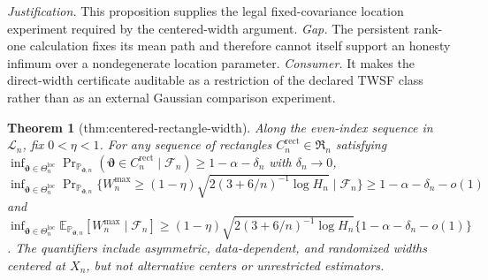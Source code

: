 \documentclass{article}
\newtheorem{theorem}{Theorem}
\begin{document}
\par\smallskip\noindent \textit{Justification.} This proposition supplies the legal fixed-covariance location experiment required by the centered-width argument. \textit{Gap.} The persistent rank-one calculation fixes its mean path and therefore cannot itself support an honesty infimum over a nondegenerate location parameter. \textit{Consumer.} It makes the direct-width certificate auditable as a restriction of the declared TWSF class rather than as an external Gaussian comparison experiment.

\begin{theorem}[thm:centered-rectangle-width]\label{thm:centered-rectangle-width}
Along the even-index sequence in \(\mathcal L_n\), fix \(0<\eta<1\). For any sequence of rectangles \(C_n^{\mathrm{rect}}\in\mathfrak R_n\) satisfying \(\inf_{\boldsymbol\vartheta\in\Theta_n^{\mathrm{loc}}}\Pr_{\mathbb P_{\boldsymbol\vartheta,n}}(\boldsymbol\vartheta\in C_n^{\mathrm{rect}}\mid\mathcal F_n)\ge1-\alpha-\delta_n\) with \(\delta_n\to0\), \(\inf_{\boldsymbol\vartheta\in\Theta_n^{\mathrm{loc}}}\Pr_{\mathbb P_{\boldsymbol\vartheta,n}}\{W_n^{\max}\ge(1-\eta)\sqrt{2(3+6/n)^{-1}\log H_n}\mid\mathcal F_n\}\ge1-\alpha-\delta_n-o(1)\) and \(\inf_{\boldsymbol\vartheta\in\Theta_n^{\mathrm{loc}}}\mathbb E_{\mathbb P_{\boldsymbol\vartheta,n}}[W_n^{\max}\mid\mathcal F_n]\ge(1-\eta)\sqrt{2(3+6/n)^{-1}\log H_n}\{1-\alpha-\delta_n-o(1)\}\). The quantifiers include asymmetric, data-dependent, and randomized widths centered at \(X_n\), but not alternative centers or unrestricted estimators.
\end{theorem}
\end{document}
